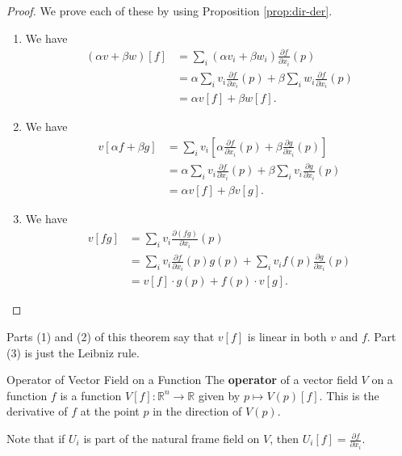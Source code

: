 \documentclass[10pt]{report}
\begin{document}
\begin{proof}
	We prove each of these by using Proposition \ref{prop:dir-der}.

	\begin{enumerate}
		\item We have
			\begin{align*}
				(\alpha v + \beta w)[f] &= \sum_i (\alpha v_i + \beta w_i) \frac{\partial f}{\partial x_i} (p) \\
							&= \alpha \sum_i v_i \frac{\partial f}{\partial x_i} (p) + \beta \sum_i w_i \frac{\partial f}{\partial x_i} (p) \\
							&= \alpha v[f] + \beta w[f].
			\end{align*}

		\item We have
			\begin{align*}
				v[\alpha f + \beta g] &= \sum_i v_i \left[ \alpha \frac{\partial f}{\partial x_i} (p) + \beta \frac{\partial g}{\partial x_i} (p) \right] \\
						      &= \alpha\sum_i v_i \frac{\partial f}{\partial x_i} (p) + \beta\sum_i v_i \frac{\partial g}{\partial x_i} (p) \\
						      &= \alpha v[f] + \beta v[g].
			\end{align*}

		\item We have
			\begin{align*}
				v[fg] &= \sum_i v_i \frac{\partial (fg)}{\partial x_i} (p) \\
				      &= \sum_i v_i \frac{\partial f}{\partial x_i} (p) g(p) + \sum_i v_i f(p) \frac{\partial g}{\partial x_i} (p) \\
				      &= v[f] \cdot g(p) + f(p) \cdot v[g].
			\end{align*}
\end{enumerate}
\end{proof}

Parts (1) and (2) of this theorem say that $v[f]$ is linear in both $v$ and $f$. Part (3) is just the Leibniz rule.

\begin{defn}{Operator of Vector Field on a Function}{}
	The \textbf{operator} of a vector field $V$ on a function $f$ is a function $V[f]:\mathbb{R}^n \to \mathbb{R}$ given by $p\mapsto V(p)[f]$. This is the derivative of $f$ at the point $p$ in the direction of $V(p)$.
\end{defn}

Note that if $U_i$ is part of the natural frame field on $V$, then $U_i[f] = \frac{\partial f}{\partial x_i} .$
\end{document}
